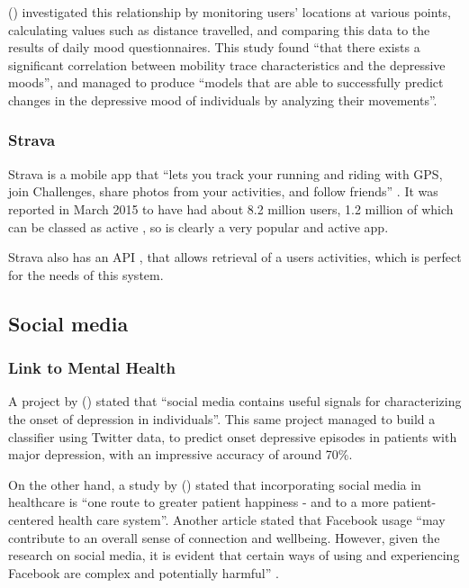 \documentclass[11pt,openright,a4paper]{report}
\begin{document}
\citeauthor{canzian2015trajectories} (\citeyear{canzian2015trajectories}) investigated this relationship by monitoring users' locations at various points, calculating values such as distance travelled, and comparing this data to the results of daily mood questionnaires. This study found \enquote{that there exists a significant correlation between mobility trace characteristics and the depressive moods}, and managed to produce \enquote{models that are able to successfully predict changes in the depressive mood of individuals by analyzing their movements}.

\subsubsection{Strava}
Strava is a mobile app that \enquote{lets you track your running and riding with GPS, join Challenges, share photos from your activities, and follow friends} \parencite{stravamobile}. It was reported in March 2015 to have had about 8.2 million users, 1.2 million of which can be classed as active \parencite{stravausers}, so is clearly a very popular and active app.

Strava also has an API \parencite{stravaapi}, that allows retrieval of a users activities, which is perfect for the needs of this system.

\subsection{Social media}
\subsubsection{Link to Mental Health}
A project by \citeauthor{de2013predicting} (\citeyear{de2013predicting}) stated that \enquote{social media contains useful signals for characterizing the onset of depression in individuals}. This same project managed to build a classifier using Twitter data, to predict onset depressive episodes in patients with major depression, with an impressive accuracy of around 70\%.

On the other hand, a study by \citeauthor{hawn2009take} (\citeyear{hawn2009take}) stated that incorporating social media in healthcare is \enquote{one route to greater patient happiness - and to a more patient-centered health care system}. Another article stated that Facebook usage \enquote{may contribute to an overall sense of connection and wellbeing. However, given the research on social media, it is evident that certain ways of using and experiencing Facebook are complex and potentially harmful} \parencite{smhurtorhelp}.
\end{document}
